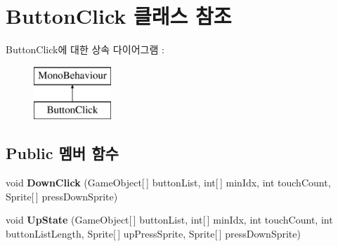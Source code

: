 \hypertarget{class_button_click}{}\section{Button\+Click 클래스 참조}
\label{class_button_click}
Button\+Click에 대한 상속 다이어그램 \+: \begin{figure}[H]
\begin{center}
\leavevmode
\includegraphics[height=2.000000cm]{class_button_click}
\end{center}
\end{figure}
\subsection*{Public 멤버 함수}
\begin{DoxyCompactItemize}
\item 
\hypertarget{class_button_click_a7b9b4b6dbd02cd9ac9ab2cce74096761}{}void {\bfseries Down\+Click} (Game\+Object\mbox{[}$\,$\mbox{]} button\+List, int\mbox{[}$\,$\mbox{]} min\+Idx, int touch\+Count, Sprite\mbox{[}$\,$\mbox{]} press\+Down\+Sprite)\label{class_button_click_a7b9b4b6dbd02cd9ac9ab2cce74096761}

\item 
\hypertarget{class_button_click_a49531b363b58a3b03d0481975faea7e6}{}void {\bfseries Up\+State} (Game\+Object\mbox{[}$\,$\mbox{]} button\+List, int\mbox{[}$\,$\mbox{]} min\+Idx, int touch\+Count, int button\+List\+Length, Sprite\mbox{[}$\,$\mbox{]} up\+Press\+Sprite, Sprite\mbox{[}$\,$\mbox{]} press\+Down\+Sprite)\label{class_button_click_a49531b363b58a3b03d0481975faea7e6}

\end{DoxyCompactItemize}
